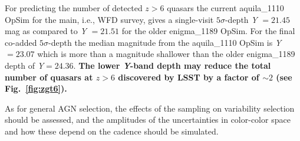 For predicting the number of detected $z>6$ quasars
the current 
aquila\_{}1110 OpSim for the main, i.e., WFD survey, gives a
single-visit $5\sigma$-depth
{\it Y} $= 21.45$ mag as compared to {\it Y} $= 21.51$ for the older enigma\_{}1189 OpSim.
For the final co-added $5\sigma$-depth the median magnitude from the aquila\_{}1110
OpSim is 
{\it Y}$ = 23.07$ which is more than a magnitude shallower than the older enigma\_{}1189 
depth of {\it Y}$ = 24.36$.
{\bf The lower {\it Y}-band depth may reduce the total number of quasars at $z > 6$ discovered by LSST by
a factor of $\sim 2$
(see Fig.~\ref{fig:zgt6}).}



As for general AGN selection, the effects of the sampling on variability selection
should be assessed, and the amplitudes of the uncertainties in color-color space
and how these depend on the cadence should be simulated.

%
%
%
%

\navigationbar
